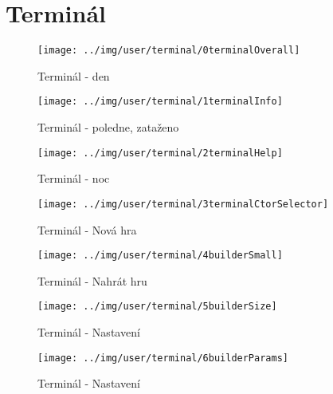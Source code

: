 
\section{Terminál}



\begin{figure}[h!]\centering
\texttt{[image: ../img/user/terminal/0terminalOverall]}

\caption{Terminál - den}
\label{fig:user_terminal_0terminalOverall}

\end{figure}

\begin{figure}[h!]\centering
\texttt{[image: ../img/user/terminal/1terminalInfo]}

\caption{Terminál - poledne, zataženo}
\label{fig:user_terminal_1terminalInfo}

\end{figure}

\begin{figure}[h!]\centering
\texttt{[image: ../img/user/terminal/2terminalHelp]}

\caption{Terminál - noc}
\label{fig:user_terminal_2terminalHelp}

\end{figure}


\begin{figure}[h!]\centering
\texttt{[image: ../img/user/terminal/3terminalCtorSelector]}

\caption{Terminál - Nová hra}
\label{fig:user_terminal_3terminalCtorSelector}

\end{figure}

\begin{figure}[h!]\centering
\texttt{[image: ../img/user/terminal/4builderSmall]}

\caption{Terminál - Nahrát hru}
\label{fig:user_terminal_4builderSmall}

\end{figure}


\begin{figure}[h!]\centering
\texttt{[image: ../img/user/terminal/5builderSize]}

\caption{Terminál - Nastavení}
\label{fig:user_terminal_5builderSize}

\end{figure}


\begin{figure}[h!]\centering
\texttt{[image: ../img/user/terminal/6builderParams]}

\caption{Terminál - Nastavení}
\label{fig:user_terminal_6builderParams}

\end{figure}